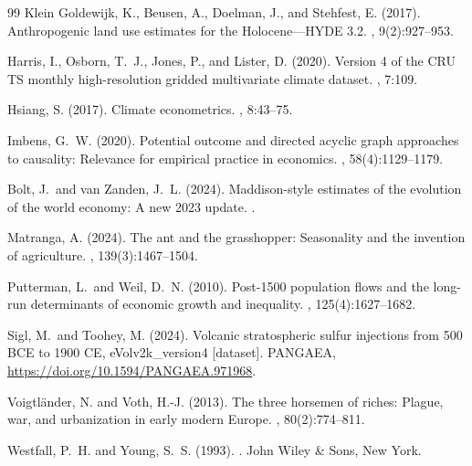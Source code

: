 \documentclass[11pt,letterpaper]{article}
\begin{document}
\begin{thebibliography}{99}
Klein Goldewijk, K., Beusen, A., Doelman, J., and Stehfest, E. (2017).
\newblock Anthropogenic land use estimates for the Holocene---{HYDE 3.2}.
, 9(2):927--953.

Harris, I., Osborn, T.~J., Jones, P., and Lister, D. (2020).
\newblock Version 4 of the {CRU TS} monthly high-resolution gridded multivariate climate dataset.
, 7:109.

Hsiang, S. (2017).
\newblock Climate econometrics.
, 8:43--75.

Imbens, G.~W. (2020).
\newblock Potential outcome and directed acyclic graph approaches to causality: Relevance for empirical practice in economics.
, 58(4):1129--1179.

Bolt, J.\ and van Zanden, J.~L. (2024).
\newblock Maddison-style estimates of the evolution of the world economy: A new 2023 update.
.

Matranga, A. (2024).
\newblock The ant and the grasshopper: Seasonality and the invention of agriculture.
, 139(3):1467--1504.

Putterman, L.\ and Weil, D.~N. (2010).
\newblock Post-1500 population flows and the long-run determinants of economic growth and inequality.
, 125(4):1627--1682.

Sigl, M.\ and Toohey, M. (2024).
\newblock Volcanic stratospheric sulfur injections from 500 BCE to 1900 CE, eVolv2k\_version4 [dataset].
\newblock PANGAEA, \url{https://doi.org/10.1594/PANGAEA.971968}.

Voigtl\"ander, N. and Voth, H.-J. (2013).
\newblock The three horsemen of riches: Plague, war, and urbanization in early modern Europe.
, 80(2):774--811.

Westfall, P.~H. and Young, S.~S. (1993).
.
\newblock John Wiley \& Sons, New York.

\end{thebibliography}
\end{document}
